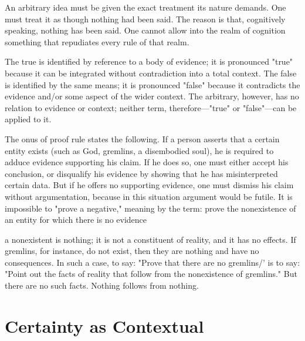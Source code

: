         An arbitrary idea must be given the exact treatment its nature demands. One must treat it as though nothing had been said. The reason is that, cognitively speaking, nothing has been said. One cannot allow into the realm of cognition something that repudiates every rule of that realm.
        
        The true is identified by reference to a body of evidence; it is pronounced "true" because it can be integrated without contradiction into a total context. The false is identified by the same means; it is pronounced "false" because it contradicts the evidence and/or some aspect of the wider context. The arbitrary, however, has no relation to evidence or context; neither term, therefore—"true" or "false"—can be applied to it.
        
        The onus of proof rule states the following. If a person asserts that a certain entity exists (such as God, gremlins, a disembodied soul), he is required to adduce evidence supporting his claim. If he does so, one must either accept his conclusion, or disqualify his evidence by showing that he has misinterpreted certain data. But if he offers no supporting evidence, one must dismiss his claim without argumentation, because in this situation argument would be futile. It is impossible to "prove a negative," meaning by the term: prove the nonexistence of an entity for which there is no evidence
        
        a nonexistent is nothing; it is not a constituent of reality, and it has no effects. If gremlins, for instance, do not exist, then they are nothing and have no consequences. In such a case, to say: "Prove that there are no gremlins/' is to say: "Point out the facts of reality that follow from the nonexistence of gremlins." But there are no such facts. Nothing follows from nothing.

    \section{Certainty as Contextual}